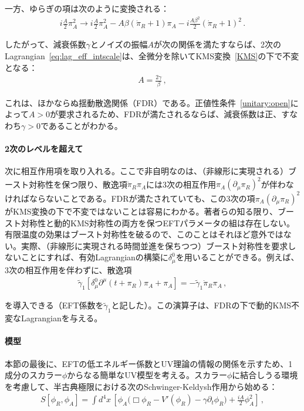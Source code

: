 一方、ゆらぎの項は次のように変換される：
\begin{align}
 i\frac{A}{2}\pi_A^2 
 \to i\frac{A}{2}\pi_A^2 
-A\beta(\dot{\pi}_R+1)\pi_A
 - i\frac{A\beta^2}{2}(\dot{\pi}_R+1)^2\,.
\end{align}

したがって、減衰係数$\gamma$とノイズの振幅$A$が次の関係を満たすならば、2次のLagrangian~\eqref{eq:lag_eff_intscale}は、全微分を除いてKMS変換~\eqref{KMS}の下で不変となる：
\begin{align}
A=\frac{2\gamma}{\beta}\,,
\end{align}

これは、ほかならぬ揺動散逸関係（FDR）である。正値性条件~\eqref{unitary:open}によって$A>0$が要求されるため、FDRが満たされるならば、減衰係数は正、すなわち$\gamma>0$であることがわかる。

\paragraph{2次のレベルを超えて}

次に相互作用項を取り入れる。ここで非自明なのは、（非線形に実現される）ブースト対称性を保つ限り、散逸項$\dot{\pi}_R\pi_A$には3次の相互作用$\pi_A(\partial_\mu\pi_R)^2$が伴わなければならないことである。FDRが満たされていても、この3次の項$\pi_A(\partial_\mu\pi_R)^2$がKMS変換の下で不変ではないことは容易にわかる。著者らの知る限り、ブースト対称性と動的KMS対称性の両方を保つEFTパラメータの組は存在しない。有限温度の効果はブースト対称性を破るので、このことはそれほど意外ではない。実際、（非線形に実現される時間並進を保ちつつ）ブースト対称性を要求しないことにすれば、有効Lagrangianの構築に$\delta^0_\mu$を用いることができる。例えば、3次の相互作用を伴わずに、散逸項
\begin{align}
\label{Lorentz_breaking_dissipation}
\widetilde{\gamma}_1\left[\delta^0_\mu\partial^\mu(t+\pi_R)\pi_A+\pi_A\right]=-\widetilde{\gamma}_1\dot{\pi}_R\pi_A\,,
\end{align}

を導入できる（EFT係数を$\widetilde{\gamma}_1$と記した）。この演算子は、FDRの下で動的KMS不変なLagrangianを与える。

\label{sec:ModelAnalysis}

\paragraph{模型}

本節の最後に、EFTの低エネルギー係数とUV理論の情報の関係を示すため、1成分のスカラー$\phi$からなる簡単なUV模型を考える。スカラー$\phi$に結合しうる環境を考慮して、半古典極限における次のSchwinger-Keldysh作用から始める：
\begin{align}
\label{scalar_model}
S[\phi_R,\phi_A] 
 =\int d^4x\,\left[
\phi_A\Big(\Box\phi_R-V'(\phi_R)
 - \gamma\partial_t\phi_R\Big)
 +\frac{iA}{2}\phi_A^2
 \right]\,,
\end{align}

